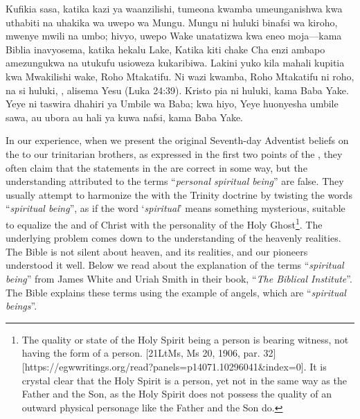 Kufikia sasa, katika kazi ya waanzilishi, tumeona kwamba  umeunganishwa kwa uthabiti na uhakika wa uwepo wa Mungu. Mungu ni huluki binafsi wa kiroho, mwenye mwili na umbo; hivyo, uwepo Wake unatatizwa kwa eneo moja—kama Biblia inavyosema, katika hekalu Lake, Katika kiti chake Cha enzi ambapo amezungukwa na utukufu usioweza kukaribiwa. Lakini yuko kila mahali kupitia kwa Mwakilishi wake, Roho Mtakatifu. Ni wazi kwamba, Roho Mtakatifu ni roho, na si huluki, , alisema Yesu (Luka 24:39). Kristo pia ni huluki, kama Baba Yake. Yeye ni taswira dhahiri ya Umbile wa Baba; kwa hiyo, Yeye huonyesha umbile sawa, au ubora au hali ya kuwa nafsi, kama Baba Yake.


In our experience, when we present the original Seventh-day Adventist beliefs on the  to our trinitarian brothers, as expressed in the first two points of the , they often claim that the statements in the  are correct in some way, but the understanding attributed to the terms “\textit{personal spiritual being}” are false. They usually attempt to harmonize the  with the Trinity doctrine by twisting the words “\textit{spiritual being}”, as if the word ‘\textit{spiritual}’ means something mysterious, suitable to equalize the  and of Christ with the personality of the Holy Ghost\footnote{The quality or state of the Holy Spirit being a person is bearing witness, not having the form of a person. [21LtMs, Ms 20, 1906, par. 32][https://egwwritings.org/read?panels=p14071.10296041&index=0]. It is crystal clear that the Holy Spirit is a person, yet not in the same way as the Father and the Son, as the Holy Spirit does not possess the quality of an outward physical personage like the Father and the Son do.}. The underlying problem comes down to the understanding of the heavenly realities. The Bible is not silent about heaven, and its realities, and our pioneers understood it well. Below we read about the explanation of the terms “\textit{spiritual being}” from James White and Uriah Smith in their book, “\textit{The Biblical Institute}”. The Bible explains these terms using the example of angels, which are “\textit{spiritual beings}”.


